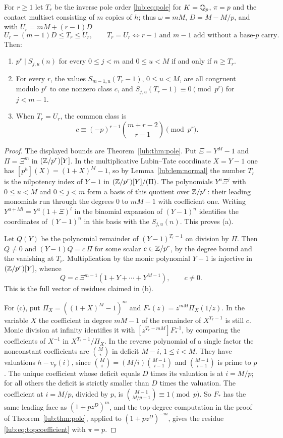 \begin{theorem}\label{lub:thm:fleck}
For $r\ge1$ let $T_r$ be the inverse pole order \eqref{lub:eq:pole} for $K=\mathbb{Q}_p$, $\pi=p$
and the contact multiset consisting of $m$ copies of $h$; thus $\omega=mM$, $D=M-M/p$, and
with $U_r=mM+(r-1)D$
\[
 U_r-(m-1)D\le T_r\le U_r,\qquad
 T_r=U_r\iff\text{$r-1$ and $m-1$ add without a base-$p$ carry.}
\]
Then:
\begin{enumerate}[label=\textup{(\alph*)}]
\item $p^r\mid S_{j,u}(n)$ for every $0\le j<m$ and $0\le u<M$ if and only if $n\ge T_r$.
\item For every $r$, the values $S_{m-1,u}(T_r-1)$, $0\le u<M$, are all congruent modulo
$p^r$ to one nonzero class $c$, and $S_{j,u}(T_r-1)\equiv0\pmod{p^r}$ for $j<m-1$.
\item When $T_r=U_r$, the common class is
\[
 c\equiv(-p)^{r-1}\binom{m+r-2}{r-1}\pmod{p^r}.
\]
\end{enumerate}
\end{theorem}
\begin{proof}
The displayed bounds are Theorem~\ref{lub:thm:pole}. Put $\Xi=Y^M-1$ and $\Pi=\Xi^m$ in
$(\mathbb{Z}/p^r)[Y]$. In the multiplicative Lubin--Tate coordinate $X=Y-1$ one has
$[p^h](X)=(1+X)^M-1$, so by Lemma~\ref{lub:lem:normal} the number $T_r$ is the nilpotency index
of $Y-1$ in $(\mathbb{Z}/p^r)[Y]/(\Pi)$. The polynomials $Y^u\Xi^j$ with $0\le u<M$ and $0\le j<m$
form a basis of this quotient over $\mathbb{Z}/p^r$: their leading monomials run through the
degrees $0$ to $mM-1$ with coefficient one. Writing $Y^{u+Ml}=Y^u(1+\Xi)^l$ in the binomial
expansion of $(Y-1)^n$ identifies the coordinates of $(Y-1)^n$ in this basis with the
$S_{j,u}(n)$. This proves (a).

Let $Q(Y)$ be the polynomial remainder of $(Y-1)^{T_r-1}$ on division by $\Pi$. Then
$Q\ne0$ and $(Y-1)Q=c\,\Pi$ for some scalar $c\in\mathbb{Z}/p^r$, by the degree bound and the
vanishing at $T_r$. Multiplication by the monic polynomial $Y-1$ is injective in
$(\mathbb{Z}/p^r)[Y]$, whence
\[
 Q=c\,\Xi^{m-1}(1+Y+\cdots+Y^{M-1}),\qquad c\ne0 .
\]
This is the full vector of residues claimed in (b).

For (c), put $\Pi_X=((1+X)^M-1)^m$ and $F_*(z)=z^{mM}\Pi_X(1/z)$. In the variable $X$ the
coefficient in degree $mM-1$ of the remainder of $X^{T_r-1}$ is still $c$. Monic division
at infinity identifies it with $[z^{T_r-mM}]F_*^{-1}$, by comparing the coefficients of
$X^{-1}$ in $X^{T_r-1}/\Pi_X$. In the reverse polynomial of a single factor the nonconstant
coefficients are $\binom Mi$ in deficit $M-i$, $1\le i<M$. They have valuations
$h-v_p(i)$, since $\binom Mi=(M/i)\binom{M-1}{i-1}$ and $\binom{M-1}{i-1}$ is prime to $p$.
The unique coefficient whose deficit equals $D$ times its valuation is at $i=M/p$; for all
others the deficit is strictly smaller than $D$ times the valuation. The coefficient at
$i=M/p$, divided by $p$, is
$\binom{M-1}{M/p-1}\equiv1\pmod p$. So $F_*$ has the same leading face as $(1+pz^D)^m$, and
the top-degree computation in the proof of Theorem~\ref{lub:thm:pole}, applied to
$(1+pz^D)^{-m}$, gives the residue \eqref{lub:eq:topcoefficient} with $\pi=p$.
\end{proof}

